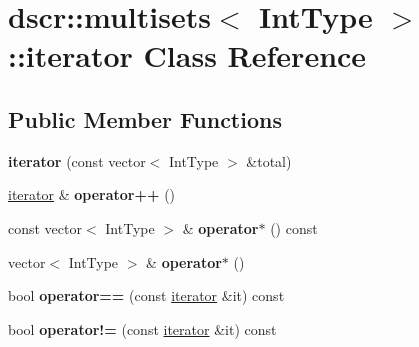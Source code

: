 \hypertarget{classdscr_1_1multisets_1_1iterator}{\section{dscr\-:\-:multisets$<$ Int\-Type $>$\-:\-:iterator Class Reference}
\label{classdscr_1_1multisets_1_1iterator}
}
\subsection*{Public Member Functions}
\begin{DoxyCompactItemize}
\item 
\hypertarget{classdscr_1_1multisets_1_1iterator_a79cbfdaf04b4bd0d31353e758af151f0}{{\bfseries iterator} (const vector$<$ Int\-Type $>$ \&total)}\label{classdscr_1_1multisets_1_1iterator_a79cbfdaf04b4bd0d31353e758af151f0}

\item 
\hypertarget{classdscr_1_1multisets_1_1iterator_a79e5541067b0d68edc652371ae55d499}{\hyperlink{classdscr_1_1multisets_1_1iterator}{iterator} \& {\bfseries operator++} ()}\label{classdscr_1_1multisets_1_1iterator_a79e5541067b0d68edc652371ae55d499}

\item 
\hypertarget{classdscr_1_1multisets_1_1iterator_af596f250e99099f04f70182e73627e61}{const vector$<$ Int\-Type $>$ \& {\bfseries operator$\ast$} () const }\label{classdscr_1_1multisets_1_1iterator_af596f250e99099f04f70182e73627e61}

\item 
\hypertarget{classdscr_1_1multisets_1_1iterator_a6665e84f085dcb7d637639f084e9c722}{vector$<$ Int\-Type $>$ \& {\bfseries operator$\ast$} ()}\label{classdscr_1_1multisets_1_1iterator_a6665e84f085dcb7d637639f084e9c722}

\item 
\hypertarget{classdscr_1_1multisets_1_1iterator_a62ba63be54b1f2695099c0f50486f834}{bool {\bfseries operator==} (const \hyperlink{classdscr_1_1multisets_1_1iterator}{iterator} \&it) const }\label{classdscr_1_1multisets_1_1iterator_a62ba63be54b1f2695099c0f50486f834}

\item 
\hypertarget{classdscr_1_1multisets_1_1iterator_a8fac5deeda206162d3187e90d1651701}{bool {\bfseries operator!=} (const \hyperlink{classdscr_1_1multisets_1_1iterator}{iterator} \&it) const }\label{classdscr_1_1multisets_1_1iterator_a8fac5deeda206162d3187e90d1651701}

\end{DoxyCompactItemize}

